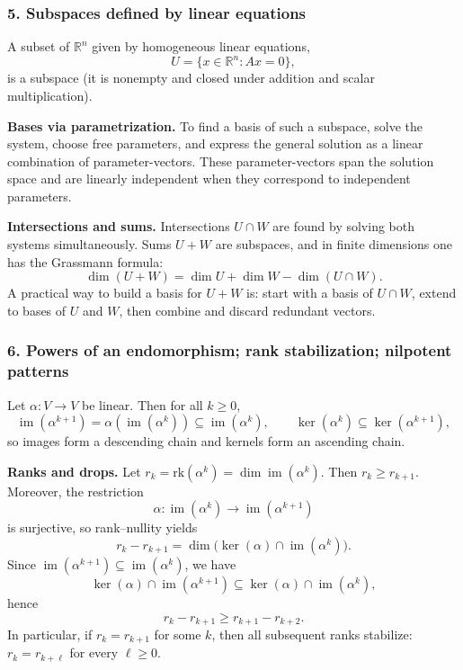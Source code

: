\documentclass[12pt,a4paper]{article}
\theoremstyle{plain}
\theoremstyle{definition}      %
\begin{document}
\bigskip

\subsubsection*{5. Subspaces defined by linear equations}

A subset of $\mathbb R^n$ given by homogeneous linear equations,
\[
U=\{x\in\mathbb R^n:Ax=0\},
\]
is a subspace (it is nonempty and closed under addition and scalar multiplication).

\medskip
\noindent\textbf{Bases via parametrization.}
To find a basis of such a subspace, solve the system, choose free parameters, and express the general solution as
a linear combination of parameter-vectors. These parameter-vectors span the solution space and are linearly independent
when they correspond to independent parameters.

\medskip
\noindent\textbf{Intersections and sums.}
Intersections $U\cap W$ are found by solving both systems simultaneously. Sums $U+W$ are subspaces, and in finite
dimensions one has the Grassmann formula:
\[
\dim(U+W)=\dim U+\dim W-\dim(U\cap W).
\]
A practical way to build a basis for $U+W$ is: start with a basis of $U\cap W$, extend to bases of $U$ and $W$, then
combine and discard redundant vectors.

\bigskip

\subsubsection*{6. Powers of an endomorphism; rank stabilization; nilpotent patterns}

Let $\alpha:V\to V$ be linear. Then for all $k\ge 0$,
\[
\operatorname{im}(\alpha^{k+1})=\alpha(\operatorname{im}(\alpha^k))\subseteq \operatorname{im}(\alpha^k),
\qquad
\ker(\alpha^k)\subseteq \ker(\alpha^{k+1}),
\]
so images form a descending chain and kernels form an ascending chain.

\medskip
\noindent\textbf{Ranks and drops.}
Let $r_k=\mathrm{rk}(\alpha^k)=\dim\operatorname{im}(\alpha^k)$. Then $r_k\ge r_{k+1}$.
Moreover, the restriction
\[
\alpha:\operatorname{im}(\alpha^k)\to \operatorname{im}(\alpha^{k+1})
\]
is surjective, so rank--nullity yields
\[
r_k-r_{k+1}=\dim\big(\ker(\alpha)\cap \operatorname{im}(\alpha^k)\big).
\]
Since $\operatorname{im}(\alpha^{k+1})\subseteq \operatorname{im}(\alpha^k)$, we have
\[
\ker(\alpha)\cap \operatorname{im}(\alpha^{k+1})
\subseteq
\ker(\alpha)\cap \operatorname{im}(\alpha^k),
\]
hence
\[
r_k-r_{k+1}\ge r_{k+1}-r_{k+2}.
\]
In particular, if $r_k=r_{k+1}$ for some $k$, then all subsequent ranks stabilize:
$r_k=r_{k+\ell}$ for every $\ell\ge 0$.
\end{document}

